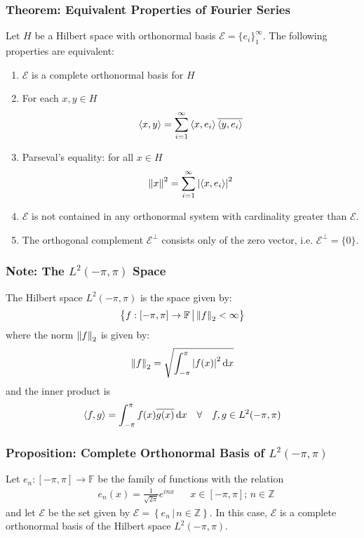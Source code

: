 \documentclass[11pt, a4paper]{article}
\newcommand{\diff}{\mathop{}\!\mathrm{d}} %
\newcommand{\F}{\mathbb{F}} %
\begin{document}
\subsubsection{Theorem: Equivalent Properties of Fourier Series}
Let $ H $ be a Hilbert space with orthonormal basis $ \mathcal{E} = \big \{ e_i \big \}_{1}^{\infty}$. The following properties are equivalent:
\begin{enumerate}
	\item $ \mathcal{E} $ is a complete orthonormal basis for $ H $
	\item For each $ x, y \in H $
	\begin{equation*}
		\expval{x, y} = \sum_{i = 1}^{\infty} \expval{x, e_i} \overline{\expval{y, e_i}}
	\end{equation*}
	
	\item Parseval's equality: for all $ x \in H $
	\begin{equation*}
		\norm{x}^2 = \sum_{i=1}^{\infty}\abs{\expval{x, e_i}}^2
	\end{equation*}
	
	\item $ \mathcal{E} $ is not contained in any orthonormal system with cardinality greater than $ \mathcal{E} $.
	
	\item The orthogonal complement $ \mathcal{E}^{\perp} $ consists only of the zero vector, i.e. $ \mathcal{E}^{\perp} = \{ 0 \} $. 
\end{enumerate}

\subsubsection{Note: The $ L^2(-\pi, \pi) $ Space}
The Hilbert space $  L^2(-\pi, \pi) $ is the space given by:
\begin{equation*}
	\left\{ f:[-\pi, \pi] \to \F \, \big | \, \norm{f}_2 < \infty \right\}
\end{equation*}
where the norm $ \norm{f}_2 $ is given by:
\begin{equation*}
	\norm{f}_2 = \sqrt{\int_{-\pi}^{\pi} \abs{f(x)}^2 \diff x}
\end{equation*}
and the inner product is
\begin{equation*}
	\expval{f, g} = \int_{-\pi}^{\pi} f(x) \overline{g(x)} \diff x \quad \forall \quad f, g \in L^2(-\pi, \pi)
\end{equation*}

\subsubsection{Proposition: Complete Orthonormal Basis of $ L^2(-\pi, \pi) $}
Let $ e_n : [-\pi , \pi] \to \F $ be the family of functions with the relation
\begin{align*}
	&e_n(x) = \frac{1}{\sqrt{2\pi}} e^{inx} &&   x \in [-\pi, \pi]; \, n \in \mathbb{Z}
\end{align*}
and let $ \mathcal{E} $ be the set given by $ \mathcal{E} = \left\{ e_n \, \big | \, n \in \mathbb{Z} \right\} $. In this case, $ \mathcal{E}  $ is a complete orthonormal basis of the Hilbert space $  L^2(-\pi, \pi) $.
\end{document}
